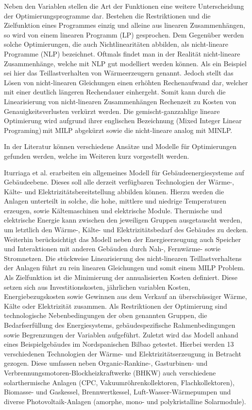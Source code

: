 Neben den Variablen stellen die Art der Funktionen eine weitere Unterscheidung der Optimierungsprogramme dar.
Bestehen die Restriktionen und die Zielfunktion eines Programmes einzig und alleine aus linearen Zusammenhängen, so wird von einem linearen Programm (LP) gesprochen.
Dem Gegenüber werden solche Optimierungen, die auch Nichtlinearitäten abbilden, als nicht-lineare Programme (NLP) bezeichnet.
Oftmals findet man in der Realität nicht-lineare Zusammenhänge, welche mit NLP gut modelliert werden können.
Als ein Beispiel sei hier das Teillastverhalten von Wärmeerzeugern genannt.
Jedoch stellt das Lösen von nicht-linearen Gleichungen einen erhöhten Rechenaufwand dar, welcher mit einer deutlich längeren Rechendauer einhergeht.
Somit kann durch die Linearisierung von nicht-linearen Zusammenhängen Rechenzeit zu Kosten von Genauigkeitsverlusten verkürzt werden. 
Die gemischt-ganzzahlige lineare Optimierung wird aufgrund ihrer englischen Bezeichnung (\glqq Mixed Integer Linear Programing\grqq)\,mit MILP abgekürzt sowie die nicht-lineare analog mit MINLP. \cite{Samsatli.2018} %

In der Literatur können verschiedene Ansätze und Modelle für Optimierungen gefunden werden, welche im Weiteren kurz vorgestellt werden.

Iturriaga et al. \cite{Iturriaga.2017} erarbeiten ein allgemeines Modell für Gebäudeenergiesysteme auf Gebäudeebene. 
Dieses soll alle derzeit verfügbaren Technologien der Wärme-, Kälte- und Elektrizitätsbereitstellung abbilden können.
Hierzu werden die Anlagen unterteilt in solche, die hohe, mittlere und niedrige Temperaturen erzeugen, sowie Kältemaschinen und elektrische Module.
Thermische und elektrische Energie kann zwischen den jeweiligen Gruppen ausgetauscht werden, um letztlich den Wärme-, Kälte- und Elektrizitätsbedarf des Gebäudes zu decken.
Weiterhin berücksichtigt das Modell neben der Energieerzeugung auch Speicher und Interaktionen mit anderen Gebäuden durch Nah-, Fernwärme- sowie Stromnetzen.
Die stückweise Linearisierung des nicht-linearen Teillastverhaltens der Anlagen führt zu rein linearen Gleichungen und somit einem MILP Problem.
Als Zielfunktion ist die Minimierung der annualisierten Kosten definiert. 
Diese setzen sich aus Investitionskosten, jährlichen variablen Kosten, Energiebezugskosten sowie Gewinnen aus dem Verkauf an überschüssiger Wärme, Kälte oder Elektrizität zusammen.
Als Restriktionen der Optimierung sind technologische Nebenbedingungen der oben genannten Gruppen, die Bedarfserfüllung des Energiesystems, gebäudespezifische Rahmenbedingungen sowie Begrenzungen der Variablen aufgeführt.
Zuletzt wird das Modell anhand eines Beispielgebäudes im Nordspanischen Bilbao getestet.
Hierbei werden 13 verschiedenen Technologien der Wärme- und Elektrizitätserzeugung in Betracht gezogen.
Diese umfassen neben Organic-Rankine-, Gasturbinen- und Verbrennungsmotoren-Blockheizkraftwerke (BHKW) auch verschiedene solarthermische Anlagen (CPC, Vakuumröhrenkollektoren, Flachkollektoren), Biomasse- und Gaskessel, Brennwertkessel, Luft-Wasser-Wärmepumpen und diverse Photovoltaik-Anlagen (amorphe, mono- und polykristalline Solarmodule).

